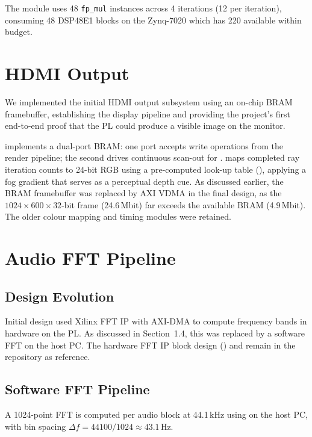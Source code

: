   The module uses 48 \texttt{fp\_mul} instances across 4 iterations (12 per
  iteration), consuming 48 DSP48E1 blocks on the Zynq-7020 which has 220
  available within budget.

\section{HDMI Output}

We implemented the initial HDMI output subsystem using an on-chip BRAM
framebuffer, establishing the display pipeline and providing the project's first
end-to-end proof that the PL could produce a visible image on the monitor.

 implements a dual-port BRAM: one port accepts write
operations from the render pipeline; the second drives continuous scan-out for
.  maps completed ray iteration
counts to 24-bit RGB using a pre-computed look-up table (),
applying a fog gradient that serves as a perceptual depth cue. As discussed earlier, the BRAM framebuffer was replaced by AXI VDMA in the
final design, as the $1024 \times 600 \times 32$-bit frame (24.6\,Mbit) far
exceeds the available BRAM (4.9\,Mbit). The older colour mapping and timing
modules were retained.


\section{Audio FFT Pipeline}

\subsection{Design Evolution}
Initial design used Xilinx FFT IP with AXI-DMA to compute frequency
bands in hardware on the PL. As discussed in Section~1.4, this was replaced by
a software FFT on the host PC. The hardware FFT IP block design
() and  remain in the repository as
reference.

\subsection{Software FFT Pipeline}
A 1024-point FFT is computed per audio block at 44.1\,kHz using
 on the host PC, with bin spacing
$\Delta f = 44100/1024 \approx 43.1$\,Hz.


